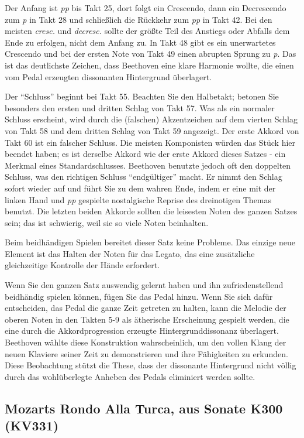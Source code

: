 Der Anfang ist \textit{pp} bis Takt 25, dort folgt ein Crescendo, dann ein Decrescendo zum \textit{p} in Takt 28 und schließlich die Rückkehr zum \textit{pp} in Takt 42.
Bei den meisten \textit{cresc.} und \textit{decresc.} sollte der größte Teil des Anstiegs oder Abfalls dem Ende zu erfolgen, nicht dem Anfang zu.
In Takt 48 gibt es ein unerwartetes Crescendo und bei der ersten Note von Takt 49 einen abrupten Sprung zu \textit{p}.
Das ist das deutlichste Zeichen, dass Beethoven eine klare Harmonie wollte, die einen vom Pedal erzeugten dissonanten Hintergrund überlagert.

Der \enquote{Schluss} beginnt bei Takt 55.
Beachten Sie den Halbetakt; betonen Sie besonders den ersten und dritten Schlag von Takt 57.
Was als ein normaler Schluss erscheint, wird durch die (falschen) Akzentzeichen auf dem vierten Schlag von Takt 58 und dem dritten Schlag von Takt 59 angezeigt.
Der erste Akkord von Takt 60 ist ein falscher Schluss.
Die meisten Komponisten würden das Stück hier beendet haben; es ist derselbe Akkord wie der erste Akkord dieses Satzes - ein Merkmal eines Standardschlusses.
Beethoven benutzte jedoch oft den doppelten Schluss, was den richtigen Schluss \enquote{endgültiger} macht.
Er nimmt den Schlag sofort wieder auf und führt Sie zu dem wahren Ende, indem er eine mit der linken Hand und \textit{pp} gespielte nostalgische Reprise des dreinotigen Themas benutzt.
Die letzten beiden Akkorde sollten die leisesten Noten des ganzen Satzes sein; das ist schwierig, weil sie so viele Noten beinhalten.

Beim beidhändigen Spielen bereitet dieser Satz keine Probleme.
Das einzige neue Element ist das Halten der Noten für das Legato, das eine zusätzliche gleichzeitige Kontrolle der Hände erfordert.

Wenn Sie den ganzen Satz auswendig gelernt haben und ihn zufriedenstellend beidhändig spielen können, fügen Sie das Pedal hinzu.
Wenn Sie sich dafür entscheiden, das Pedal die ganze Zeit getreten zu halten, kann die Melodie der oberen Noten in den Takten 5-9 als ätherische Erscheinung gespielt werden, die eine durch die Akkordprogression erzeugte Hintergrunddissonanz überlagert.
Beethoven wählte diese Konstruktion wahrscheinlich, um den vollen Klang der neuen Klaviere seiner Zeit zu demonstrieren und ihre Fähigkeiten zu erkunden.
Diese Beobachtung stützt die These, dass der dissonante Hintergrund nicht völlig durch das wohlüberlegte Anheben des Pedals eliminiert werden sollte.


\subsection{Mozarts Rondo Alla Turca, aus Sonate K300 (KV331)}
\label{c1ii25c}

